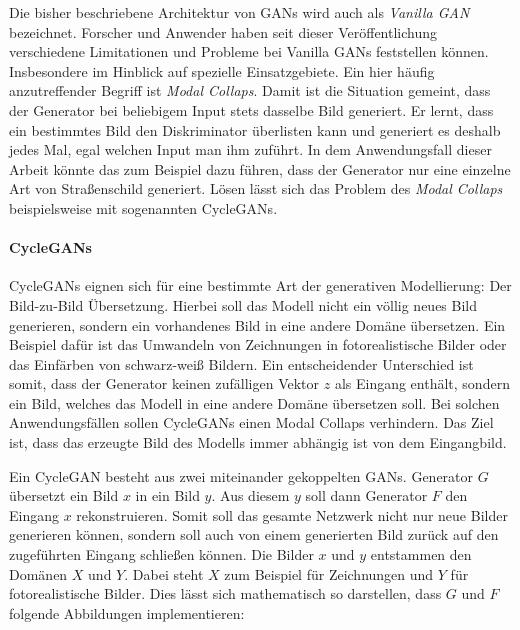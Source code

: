 
Die bisher beschriebene Architektur von \acp{GAN} wird auch als \emph{Vanilla \ac{GAN}} bezeichnet. Forscher und Anwender haben seit dieser Veröffentlichung verschiedene Limitationen und Probleme bei Vanilla \acp{GAN} feststellen können. Insbesondere im Hinblick auf spezielle Einsatzgebiete. Ein hier häufig anzutreffender Begriff ist \emph{Modal Collaps}. Damit ist die Situation gemeint, dass der Generator bei beliebigem Input stets dasselbe Bild generiert. Er lernt, dass ein bestimmtes Bild den Diskriminator überlisten kann und generiert es deshalb jedes Mal, egal welchen Input man ihm zuführt. In dem Anwendungsfall dieser Arbeit könnte das zum Beispiel dazu führen, dass der Generator nur eine einzelne Art von Straßenschild generiert. Lösen lässt sich das Problem des \emph{Modal Collaps} beispielsweise mit sogenannten \acp{CycleGAN}. \cite{visualApproach}

\paragraph{CycleGANs}
\acp{CycleGAN} eignen sich für eine bestimmte Art der generativen Modellierung: Der Bild-zu-Bild Übersetzung. Hierbei soll das Modell nicht ein völlig neues Bild generieren, sondern ein vorhandenes Bild in eine andere Domäne übersetzen. Ein Beispiel dafür ist das Umwandeln von Zeichnungen in fotorealistische Bilder oder das Einfärben von schwarz-weiß Bildern. Ein entscheidender Unterschied ist somit, dass der Generator keinen zufälligen Vektor $z$ als Eingang enthält, sondern ein Bild, welches das Modell in eine andere Domäne übersetzen soll. Bei solchen Anwendungsfällen sollen \acp{CycleGAN} einen Modal Collaps verhindern. Das Ziel ist, dass das erzeugte Bild des Modells immer abhängig ist von dem Eingangbild. \cite{cycleGAN}

Ein \ac{CycleGAN} besteht aus zwei miteinander gekoppelten \acp{GAN}. Generator $G$ übersetzt ein Bild $x$ in ein Bild $y$. Aus diesem $y$ soll dann Generator $F$ den Eingang $x$ rekonstruieren. Somit soll das gesamte Netzwerk nicht nur neue Bilder generieren können, sondern soll auch von einem generierten Bild zurück auf den zugeführten Eingang schließen können. Die Bilder $x$ und $y$ entstammen den Domänen $X$ und $Y$. Dabei steht $X$ zum Beispiel für Zeichnungen und $Y$ für fotorealistische Bilder. Dies lässt sich mathematisch so darstellen, dass $G$ und $F$ folgende Abbildungen implementieren: \cite{cycleGAN}

